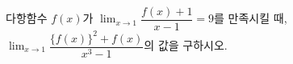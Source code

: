 다항함수 $f(x)$가 $\displaystyle\lim_{x\to 1}\dfrac{f(x)+1}{x-1}=9$를 만족시킬 때, $\displaystyle\lim_{x\to 1}\dfrac{\{f(x)\}^2+f(x)}{x^3-1}$의 값을 구하시오.
